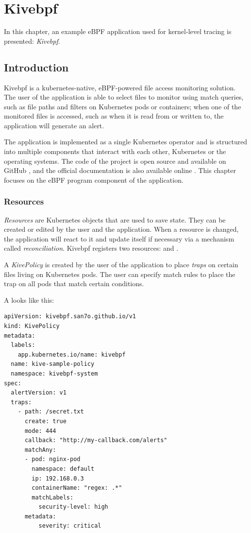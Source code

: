 \chapter{Kivebpf}

In this chapter, an example eBPF application used for kernel-level tracing is
presented: \textit{Kivebpf}.

\section{Introduction}

Kivebpf is a kubernetes-native, eBPF-powered file access monitoring solution.
The user of the application is able to select files to monitor using match
queries, such as file paths and filters on Kubernetes pods or containers; when
one of the monitored files is accessed, such as when it is read from or written
to, the application will generate an alert.

The application is implemented as a single Kubernetes operator and is structured
into multiple components that interact with each other, Kubernetes or the
operating systems.
The code of the project is open source and available on GitHub
\cite{san7o_kivebpf_code}, and the official documentation is also available
online \cite{san7o_kivebpf_docs}. This chapter focuses on the eBPF program
component of the application.

\subsection{Resources}

\textit{Resources} are Kubernetes objects that are used to save state. They can
be created or edited by the user and the application. When a resource is
changed, the application will react to it and update itself if necessary via a
mechanism called \textit{reconciliation}. Kivebpf registers two resources:
 and .

A \textit{KivePolicy} is created by the user of the application to place
\textit{traps} on certain files living on Kubernetes pods. The user can specify
match rules to place the trap on all pods that match certain conditions.

A  looks like this:

\begin{verbatim}
apiVersion: kivebpf.san7o.github.io/v1
kind: KivePolicy
metadata:
  labels:
    app.kubernetes.io/name: kivebpf
  name: kive-sample-policy
  namespace: kivebpf-system
spec:
  alertVersion: v1
  traps:
    - path: /secret.txt
      create: true
      mode: 444
      callback: "http://my-callback.com/alerts"
      matchAny:
      - pod: nginx-pod
        namespace: default
        ip: 192.168.0.3
        containerName: "regex: .*"
        matchLabels:
          security-level: high
      metadata:
          severity: critical
\end{verbatim}

